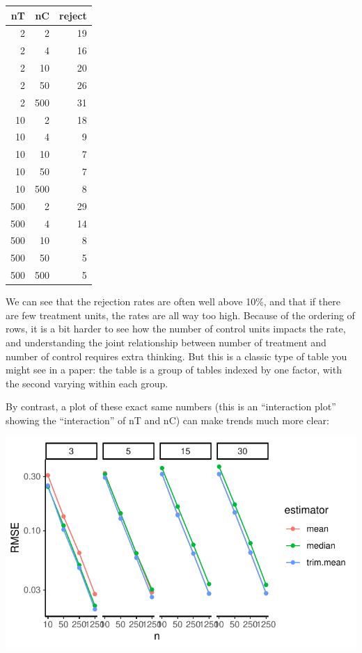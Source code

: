 \documentclass[
]{book}
\begin{document}
\begin{tabular}{r|r|r}
\hline
nT & nC & reject\\
\hline
2 & 2 & 19\\
\hline
2 & 4 & 16\\
\hline
2 & 10 & 20\\
\hline
2 & 50 & 26\\
\hline
2 & 500 & 31\\
\hline
10 & 2 & 18\\
\hline
10 & 4 & 9\\
\hline
10 & 10 & 7\\
\hline
10 & 50 & 7\\
\hline
10 & 500 & 8\\
\hline
500 & 2 & 29\\
\hline
500 & 4 & 14\\
\hline
500 & 10 & 8\\
\hline
500 & 50 & 5\\
\hline
500 & 500 & 5\\
\hline
\end{tabular}

We can see that the rejection rates are often well above 10\%, and that if there are few treatment units, the rates are all way too high.
Because of the ordering of rows, it is a bit harder to see how the number of control units impacts the rate, and understanding the joint relationship between number of treatment and number of control requires extra thinking.
But this is a classic type of table you might see in a paper: the table is a group of tables indexed by one factor, with the second varying within each group.

By contrast, a plot of these exact same numbers (this is an ``interaction plot'' showing the ``interaction'' of nT and nC) can make trends much more clear:

\begin{center}\includegraphics[width=0.75\linewidth]{Designing-Simulations-in-R_files/figure-latex/unnamed-chunk-163-1} \end{center}
\end{document}
